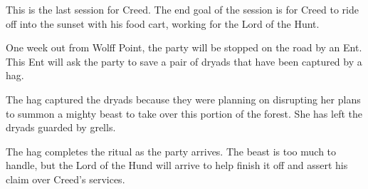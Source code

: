 This is the last session for Creed.
The end goal of the session is for Creed to ride off into the sunset with his food cart, working for the Lord of the Hunt.

One week out from Wolff Point, the party will be stopped on the road by an Ent.
This Ent will ask the party to save a pair of dryads that have been captured by a hag.

The hag captured the dryads because they were planning on disrupting her plans to summon a mighty beast to take over this portion of the forest.
She has left the dryads guarded by grells.

The hag completes the ritual as the party arrives.
The beast is too much to handle, but the Lord of the Hund will arrive to help finish it off and assert his claim over Creed's services.
